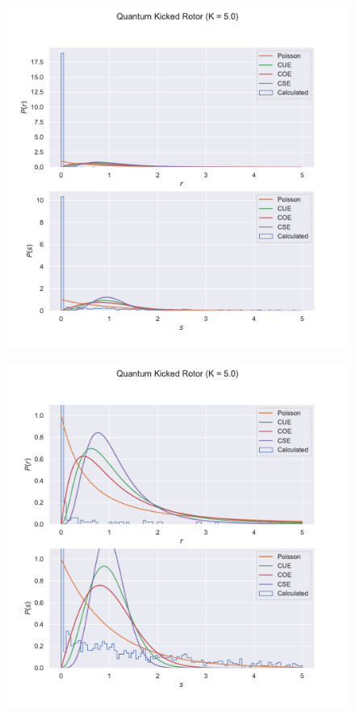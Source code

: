 \documentclass[12pt]{article}
\begin{document}
\begin{figure}
    \centering
    \includegraphics[width=\linewidth]{kickedrotor_spectrum_K5.0.pdf}
\end{figure}
\begin{figure}
    \centering
    \includegraphics[width=\linewidth]{kickedrotor_spectrum_K5.0_magnified.pdf}
\end{figure}
\end{document}
